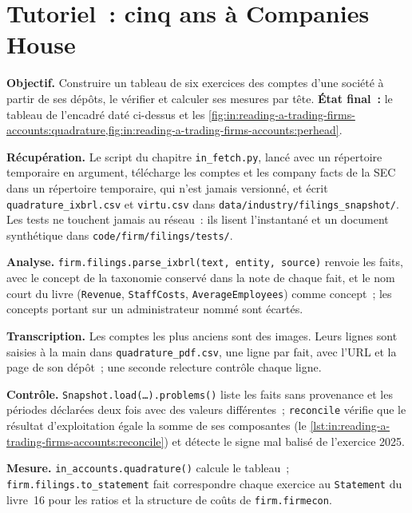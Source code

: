 \section{Tutoriel~: cinq ans à Companies House}\label{tut:in:reading-a-trading-firms-accounts:tut}

\begin{tutorial}
\textbf{Objectif.} Construire un tableau de six exercices des comptes d'une société à partir de ses dépôts, le vérifier et calculer ses mesures par
tête. \textbf{État final~:} le tableau de l'encadré daté ci-dessus et
les \cref{fig:in:reading-a-trading-firms-accounts:quadrature,fig:in:reading-a-trading-firms-accounts:perhead}.
\begin{tutsteps}
\item \textbf{Récupération.} Le script du chapitre \texttt{in\_fetch.py}, lancé avec un répertoire temporaire en argument, télécharge les
comptes  et les company facts de la SEC dans un répertoire temporaire, qui n'est jamais versionné, et écrit
\texttt{quadrature\_ixbrl.csv} et \texttt{virtu.csv} dans \texttt{data/industry/filings\_snapshot/}. Les tests ne touchent jamais
au réseau~: ils lisent l'instantané et un document  synthétique dans \texttt{code/firm/filings/tests/}.
\item \textbf{Analyse.} \texttt{firm.filings.parse\_ixbrl(text, entity, source)} renvoie les faits, avec le concept de la taxonomie
conservé dans la note de chaque fait, et le nom court du livre (\texttt{Revenue}, \texttt{StaffCosts},
\texttt{AverageEmployees}) comme concept~; les concepts portant sur un administrateur nommé sont écartés.
\item \textbf{Transcription.} Les comptes les plus anciens sont des images. Leurs lignes sont saisies à la main dans
\texttt{quadrature\_pdf.csv}, une ligne par fait, avec l'URL et la page de son dépôt~; une seconde relecture contrôle chaque ligne.
\item \textbf{Contrôle.} \texttt{Snapshot.load(\dots).problems()} liste les faits sans provenance et les périodes déclarées deux fois
avec des valeurs différentes~; \texttt{reconcile} vérifie que le résultat d'exploitation égale la somme de ses composantes
(le \cref{lst:in:reading-a-trading-firms-accounts:reconcile}) et détecte le signe mal balisé de l'exercice 2025.
\label{lst:in:reading-a-trading-firms-accounts:reconcile}
\item \textbf{Mesure.} \texttt{in\_accounts.quadrature()} calcule le tableau~; \texttt{firm.filings.to\_statement} fait correspondre
chaque exercice au \texttt{Statement} du livre~16 pour les ratios et la structure de coûts de \texttt{firm.firmecon}.
\end{tutsteps}
\end{tutorial}

